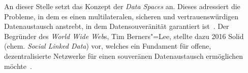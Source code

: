 An dieser Stelle setzt das Konzept der \emph{Data Spaces} an. Dieses adressiert die Probleme, in dem es einen multilateralen, sicheren und vertrauenswürdigen Datenaustausch anstrebt, in dem Datensouveränität garantiert ist~\cite{mollerIndustrialDataEcosystems2024}.
Der Begründer des \emph{World Wide Web}s, Tim Berners"=Lee, stellte dazu 2016 Solid (ehem. \emph{Social Linked Data}) vor, welches ein Fundament für offene, dezentralisierte Netzwerke für einen souveränen Datenaustausch ermöglichen möchte~\cite{mecklerWebLinkedData2023}.
